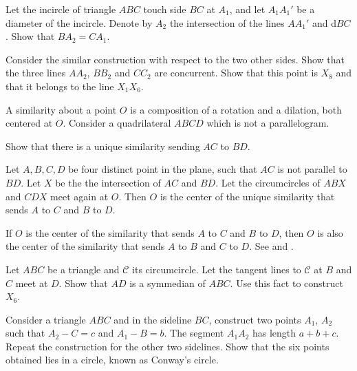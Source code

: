     \begin{exercise}
      Let the incircle of triangle $ABC$ touch side $ BC$ at $A_1$, and let $A_1 A_1'$ be a diameter of the incircle.
Denote by $A_2$ the intersection of the lines $AA_1'$  and d$BC$. Show that   $BA_2  = CA_1$.

Consider the similar construction with respect to the two other sides.
Show that the three lines $AA_2$, $BB_2$ and $CC_2$ are concurrent. Show that this point is  $X_8$ and that it belongs to the line $X_1X_6$. 


 \end{exercise}
 
 \begin{exercise}
 A    similarity    about a point $O$   is a composition of a
rotation and a dilation, both centered at $O$.
Consider a quadrilateral   $ABCD$  which is not a parallelogram.  

Show that there is a unique   similarity sending $AC$ to $BD$. 

Let $A, B, C, D$  be four distinct point in the plane, such that $AC$ is not parallel to $BD$. Let $X$ be the the intersection of
  $ AC$ and $BD$.  Let the circumcircles of $ABX $ and $CDX$ meet again at $O$. Then $O$  is the
center of the unique   similarity that sends $A $ to $C$ and $B $ to $D$.

If $O$ is the center of the   similarity that sends $A$ to $C$ and $B$ to $D$, then $O$ is also the center
of the   similarity that sends $A$ to $B$ and $C$ to $  D$.
See \cite{zhao-2021} and \cite{caliz2020-area-product}.
\end{exercise}

\begin{exercise}
Let $ABC$ be a triangle and $\mathcal{C}$  its circumcircle. Let the tangent lines to $\mathcal{C}$  at $B$ and $C$ meet at $D$.
Show that   $AD $ is  a symmedian of $ABC$.
 Use this fact to construct $X_6$.
\end{exercise}

\begin{exercise}
Consider a triangle $ABC$ and in the sideline $BC$, construct two points $A_1$, $A_2$ such that $A_2-C=c$ and $A_1-B=b$. The segment $A_1A_2$ has length $a+b+c$. Repeat the construction for the other two sidelines. Show that the six points obtained lies in a circle, known as Conway's circle.
\end{exercise}